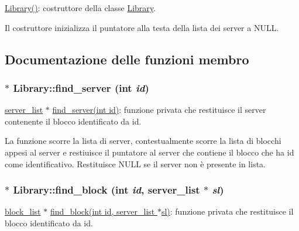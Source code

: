 \hyperlink{classLibrary_82338219d8bf51962ff5f60a0db21b19_82338219d8bf51962ff5f60a0db21b19}{Library()}: costruttore della classe \hyperlink{classLibrary}{Library}. 

Il costruttore inizializza il puntatore alla testa della lista dei server a NULL. 

\subsection{Documentazione delle funzioni membro}
\hypertarget{classLibrary_8af440e19a373cd2feabfec14509201c_8af440e19a373cd2feabfec14509201c}{
\subsubsection[{find\_\-server}]{$\ast$ Library::find\_\-server (int {\em id})}}
\label{classLibrary_8af440e19a373cd2feabfec14509201c_8af440e19a373cd2feabfec14509201c}


\hyperlink{structserver__list}{server\_\-list} $\ast$ \hyperlink{classLibrary_8af440e19a373cd2feabfec14509201c_8af440e19a373cd2feabfec14509201c}{find\_\-server(int id)}: funzione privata che restituisce il server contenente il blocco identificato da id. 

La funzione scorre la lista di server, contestualmente scorre la lista di blocchi appesi al server e restiuisce il puntatore al server che contiene il blocco che ha id come identificativo. Restituisce NULL se il server non è presente in lista. \hypertarget{classLibrary_576c1813ccd1f66558aa29a72bc9a48d_576c1813ccd1f66558aa29a72bc9a48d}{
\subsubsection[{find\_\-block}]{$\ast$ Library::find\_\-block (int {\em id}, \/  {\bf server\_\-list} $\ast$ {\em sl})}}
\label{classLibrary_576c1813ccd1f66558aa29a72bc9a48d_576c1813ccd1f66558aa29a72bc9a48d}


\hyperlink{structblock__list}{block\_\-list} $\ast$ \hyperlink{classLibrary_576c1813ccd1f66558aa29a72bc9a48d_576c1813ccd1f66558aa29a72bc9a48d}{find\_\-block(int id, server\_\-list $\ast$sl)}: funzione privata che restituisce il blocco identificato da id. 

